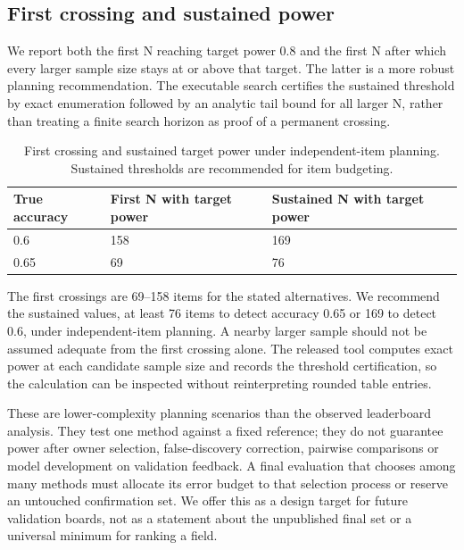 \subsection{First crossing and sustained power}

We report both the first N reaching target power 0.8 and the first N after which every larger sample size stays at or above that target. The latter is a more robust planning recommendation. The executable search certifies the sustained threshold by exact enumeration followed by an analytic tail bound for all larger N, rather than treating a finite search horizon as proof of a permanent crossing.


\begin{table}[htbp]

\caption{First crossing and sustained target power under independent-item planning. Sustained thresholds are recommended for item budgeting.}

\label{tab:3}

\small

\begin{tabularx}{\linewidth}{@{}YYY@{}}

\toprule

\textbf{True accuracy} & \textbf{First N with target power} & \textbf{Sustained N with target power} \\

\midrule

0.6 & 158 & 169 \\

0.65 & 69 & 76 \\

\bottomrule

\end{tabularx}

\end{table}

The first crossings are 69--158 items for the stated alternatives. We recommend the sustained values, at least 76 items to detect accuracy 0.65 or 169 to detect 0.6, under independent-item planning. A nearby larger sample should not be assumed adequate from the first crossing alone. The released tool computes exact power at each candidate sample size and records the threshold certification, so the calculation can be inspected without reinterpreting rounded table entries.


These are lower-complexity planning scenarios than the observed leaderboard analysis. They test one method against a fixed reference; they do not guarantee power after owner selection, false-discovery correction, pairwise comparisons or model development on validation feedback. A final evaluation that chooses among many methods must allocate its error budget to that selection process or reserve an untouched confirmation set. We offer this as a design target for future validation boards, not as a statement about the unpublished final set or a universal minimum for ranking a field.



